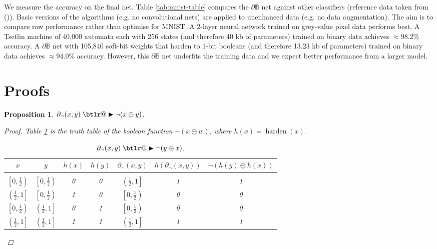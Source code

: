 \documentclass{article}
\makeatletter
\theoremstyle{plain}
\newtheorem{proposition}[theorem]{Proposition}
\theoremstyle{definition}
\theoremstyle{remark}
\DeclareRobustCommand{\btright}{\mathrel{\mathpalette\btlr@\blacktriangleright}}
\newcommand{\btlr@}[2]{%
	\begingroup
	\sbox\z@{$\m@th#1\triangleright$}%
	\sbox\tw@{\resizebox{1.1\wd\z@}{1.1\ht\z@}{\raisebox{\depth}{$\m@th#1\mkern-1mu#2$}}}%
	\ht\tw@=\ht\z@ \dp\tw@=\dp\z@ \wd\tw@=\wd\z@
	\copy\tw@
	\endgroup
}
\newcommand{\citemyauthoryear}[1]{\citeauthor{#1} (\citeyear{#1})}
\makeatother
\begin{document}
We measure the accuracy on the final net. Table \ref{tab:mnist-table} compares the $\partial\mathbb{B}$ net against other classifiers (reference data taken from \citemyauthoryear{granmo18}). Basic versions of the algorithms (e.g. no convolutional nets) are applied to unenhanced data (e.g. no data augmentation). The aim is to compare raw performance rather than optimise for MNIST. A 2-layer neural network trained on grey-value pixel data performs best. A Tsetlin machine of 40,000 automata each with 256 states (and therefore 40 kb of parameters) trained on binary data achieves $\approx 98.2\%$ accuracy. A $\partial\mathbb{B}$ net with 105,840 soft-bit weights that harden to 1-bit booleans (and therefore 13.23 kb of parameters) trained on binary data achieves $\approx 94.0\%$ accuracy. However, this $\partial\mathbb{B}$ net underfits the training data and we expect better performance from a larger model.

\section{Proofs}

\begin{proposition}\label{prop:not}
	$\partial_{\neg}(x,y) \btright \neg (x \oplus y)$.
	\begin{proof}
		Table \ref{not-table} is the truth table of the boolean function $\neg (x \oplus w)$, where $h(x) = \operatorname{harden}(x)$.
		\begin{table}[h!]
			\begin{center}
				\begin{tabular}{ccccccc}
					\multicolumn{1}{c}{$x$}  &\multicolumn{1}{c}{$y$}  &\multicolumn{1}{c}{$h(x)$}  &\multicolumn{1}{c}{$h(y)$} &\multicolumn{1}{c}{$\partial_{\neg}(x, y)$} &\multicolumn{1}{c}{$h(\partial_{\neg}(x, y))$}
					&\multicolumn{1}{c}{$\neg (h(y) \oplus h(x))$}
					\\ \hline \\
					$\left[0, \frac{1}{2}\right)$ & $\left[0, \frac{1}{2}\right)$ & 0 & 0 & $\left(\frac{1}{2},1\right]$ & 1 & 1\\[0.1cm] 
					$\left(\frac{1}{2}, 1\right]$ & $\left[0, \frac{1}{2}\right)$ &1 & 0 & $\left[0, \frac{1}{2}\right)$ & 0 & 0\\[0.1cm]
					$\left[0, \frac{1}{2}\right)$ & $\left(\frac{1}{2}, 1\right]$ &0 & 1 & $\left[0, \frac{1}{2}\right)$ & 0 & 0\\[0.1cm]
					$\left(\frac{1}{2}, 1\right]$ & $\left(\frac{1}{2}, 1\right]$ &1 & 1 & $\left(\frac{1}{2}, 1\right]$ & 1 & 1\\[0.1cm]
				\end{tabular}
			\end{center}
			\caption{$\partial_{\neg}(x,y) \btright \neg (y \oplus x)$.}\label{not-table}
		\end{table}
	\end{proof}
\end{proposition}
\end{document}
